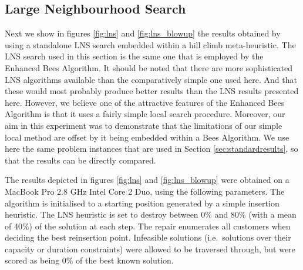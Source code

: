 \subsection{Large Neighbourhood Search}
\label{subsec:largeneighbourhoodsearch}

Next we show in figures \ref{fig:lns} and \ref{fig:lns_blowup} the results obtained by using a standalone LNS search embedded within a hill climb meta-heuristic. The LNS search used in this section is the same one that is employed by the Enhanced Bees Algorithm. It should be noted that there are more sophisticated LNS algorithms available than the comparatively simple one used here. And that these would most probably produce better results than the LNS results presented here. However, we believe one of the attractive features of the Enhanced Bees Algorithm is that it uses a fairly simple local search procedure. Moreover, our aim in this experiment was to demonstrate that the limitations of our simple local method are offset by it being embedded within a Bees Algorithm. We use here the same problem instances that are used in Section \ref{sec:standardresults}, so that the results can be directly compared.



The results depicted in figures \ref{fig:lns} and \ref{fig:lns_blowup} were obtained on a MacBook Pro 2.8 GHz Intel Core 2 Duo, using the following parameters. The algorithm is initialised to a starting position generated by a simple insertion heuristic. The LNS heuristic is set to destroy between 0\% and 80\% (with a mean of 40\%) of the solution at each step. The repair enumerates all customers when deciding the best reinsertion point. Infeasible solutions (i.e.~solutions over their capacity or duration constraints) were allowed to be traversed through, but were scored as being 0\% of the best known solution.

